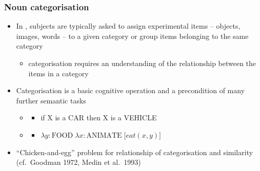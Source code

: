 \documentclass[t]{beamer} %
\begin{document}
\begin{frame}
  \frametitle{Noun categorisation}

  \begin{itemize}
  \item In , subjects are typically asked to assign experimental items -- objects, images, words -- to a given category or group items belonging to the same category
    \begin{itemize}
    \item categorisation requires an understanding of the relationship between the items in a category
    \end {itemize}
  \item Categorisation is a basic cognitive operation and a precondition of many further semantic tasks
    \begin{itemize}
    \item {}
      \begin{itemize}
      \item if X is a CAR then X is a VEHICLE
      \end{itemize}
    \item {}
      \begin{itemize}
      \item $\lambda y: \text{FOOD}\; \lambda x:\text{ANIMATE} \; \bigl[ eat(x,y) \bigr]$
      \end{itemize}
    \end{itemize}
  \item ``Chicken-and-egg'' problem for relationship of categorisation and similarity (cf.\ Goodman 1972, Medin et al.\ 1993)
  \end{itemize}
\end{frame}
\end{document}
